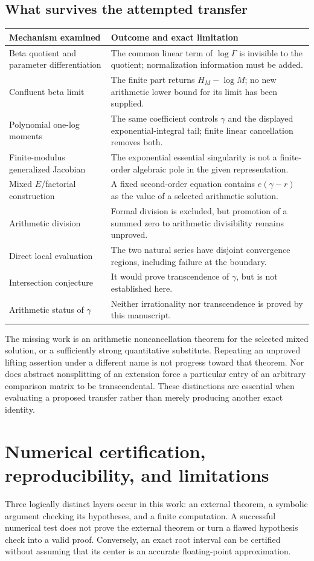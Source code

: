 \documentclass[11pt,a4paper]{article}
\numberwithin{equation}{section}
\theoremstyle{definition}
\theoremstyle{remark}
\begin{document}
\subsection{What survives the attempted transfer}
\begin{longtable}{@{}P{0.34\textwidth}P{0.60\textwidth}@{}}
\toprule
Mechanism examined & Outcome and exact limitation\\
\midrule
\endhead
Beta quotient and parameter differentiation & The common linear term of
$\log\Gamma$ is invisible to the quotient; normalization information must
be added.\\
Confluent beta limit & The finite part returns $H_M-\log M$; no new
arithmetic lower bound for its limit has been supplied.\\
Polynomial one-log moments & The same coefficient controls $\gamma$ and
the displayed exponential-integral tail; finite linear cancellation removes
both.\\
Finite-modulus generalized Jacobian & The exponential essential singularity
is not a finite-order algebraic pole in the given representation.\\
Mixed $E$/factorial construction & A fixed second-order equation contains
$e(\gamma-r)$ as the value of a selected arithmetic solution.\\
Arithmetic division & Formal division is excluded, but promotion of a
summed zero to arithmetic divisibility remains unproved.\\
Direct local evaluation & The two natural series have disjoint convergence
regions, including failure at the boundary.\\
Intersection conjecture & It would prove transcendence of $\gamma$, but
is not established here.\\
Arithmetic status of $\gamma$ & Neither irrationality nor transcendence is
proved by this manuscript.\\
\bottomrule
\end{longtable}
The missing work is an arithmetic noncancellation theorem for the selected
mixed solution, or a sufficiently strong quantitative substitute.
Repeating an unproved lifting assertion under a different name is not
progress toward that theorem. Nor does abstract nonsplitting of an
extension force a particular entry of an arbitrary comparison matrix to
be transcendental. These distinctions are essential when evaluating a
proposed transfer rather than merely producing another exact identity.

\section{Numerical certification, reproducibility, and limitations}\label{sec:verification}
Three logically distinct layers occur in this work: an external theorem,
a symbolic argument checking its hypotheses, and a finite computation.
A successful numerical test does not prove the external theorem or turn a
flawed hypothesis check into a valid proof. Conversely, an exact root
interval can be certified without assuming that its center is an accurate
floating-point approximation.
\end{document}
